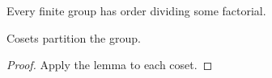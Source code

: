 \begin{theorem}[Main]\label{thm:main}
Every finite group has order dividing some factorial.
\end{theorem}

\begin{lemma}\label{lem:helper}
Cosets partition the group.
\end{lemma}

\begin{proof}
Apply the lemma to each coset.
\end{proof}
